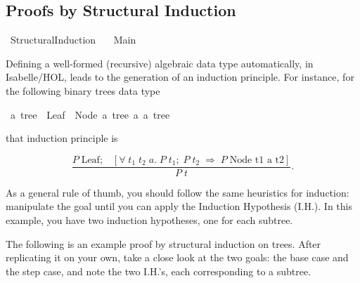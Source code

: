 %
\begin{isabellebody}%
%
%
\begin{isamarkuptext}%
\section*{Proofs by Structural Induction}%
\end{isamarkuptext}\isamarkuptrue%
%
\isadelimtheory
%
\endisadelimtheory
%
\isatagtheory
{}\isamarkupfalse%
\ Structural{\isacharunderscore}{\kern0pt}Induction\isanewline
\ \ \ Main\isanewline
{}%
\endisatagtheory
{\isafoldtheory}%
%
\isadelimtheory
%
\endisadelimtheory
%
\begin{isamarkuptext}%
Defining a well-formed (recursive) algebraic data type automatically, in Isabelle/HOL, leads
      to the generation of an induction principle. For instance, for the following binary trees data type%
\end{isamarkuptext}\isamarkuptrue%
\isamarkupfalse%
\ {\isacharprime}{\kern0pt}a\ tree\ {\isacharequal}{\kern0pt}\ Leaf\ {\isacharbar}{\kern0pt}\ Node\ {\isachardoublequoteopen}{\isacharprime}{\kern0pt}a\ tree{\isachardoublequoteclose}\ {\isacharprime}{\kern0pt}a\ {\isachardoublequoteopen}{\isacharprime}{\kern0pt}a\ tree{\isachardoublequoteclose}%
\begin{isamarkuptext}%
that induction principle is 

  \[\frac{P\; \text{Leaf};\;\;\; [\forall\; t_1\; t_2\; a.\; P\; t_1;\; P\; t_2\; \Longrightarrow\; P\; \text{Node t1 a t2}]}{P\; t}.\]

As a general rule of thumb, you should follow the same heuristics for induction: manipulate the goal
until you can apply the Induction Hypothesis (I.H.). In this example, you have two induction hypotheses, one
for each subtree.%
\end{isamarkuptext}\isamarkuptrue%
%
\begin{isamarkuptext}%
The following is an example proof by structural induction on trees.
      After replicating it on your own, take a close look at the two goals: the base case and the step case, and note the two I.H.'s,
      each corresponding to a subtree.


\end{isamarkuptext}
\end{isabellebody}
